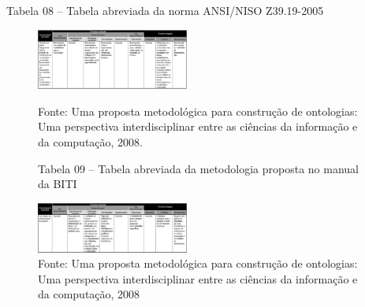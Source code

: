 \documentclass[a4paper]{report}
\begin{document}
Tabela 08 – Tabela abreviada da norma ANSI/NISO Z39.19-2005

\begin{figure}[h] 
\centering %
\includegraphics[width=5cm]{Figuras/13.png} %
\caption{Fonte: Uma proposta metodológica para construção de ontologias: Uma perspectiva interdisciplinar entre as ciências da informação e da computação, 2008.}

Tabela 09 – Tabela abreviada da metodologia proposta no manual da BITI

\centering %
\includegraphics[width=5cm]{Figuras/14.png} %
\caption{Fonte: Uma proposta metodológica para construção de ontologias: Uma perspectiva interdisciplinar entre as ciências da informação e da computação, 2008}
\end{figure}
\end{document}
